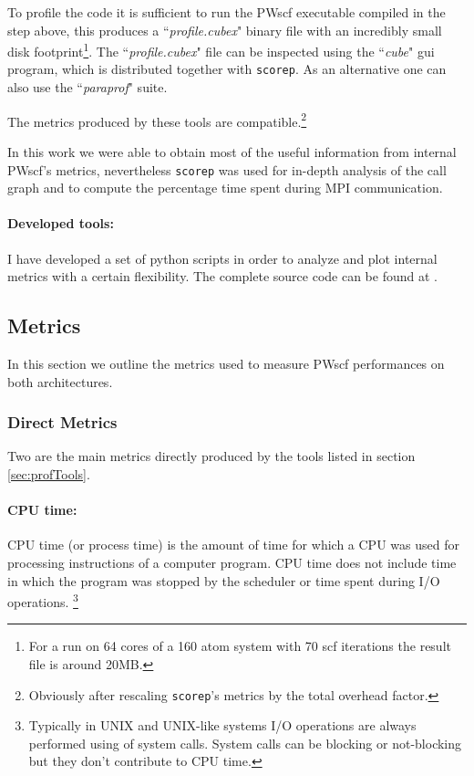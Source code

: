 \documentclass[a4paper,12pt]{article}
\begin{document}
To profile the code it is sufficient to run the PWscf executable compiled in the step above, this produces a ``\textit{profile.cubex}" binary file with an incredibly small disk footprint\footnote{For a run on 64 cores of a 160 atom system with 70 scf iterations the result file is around 20MB.}.
The ``\textit{profile.cubex}" file can be inspected using the ``\textit{cube}" gui program, which is distributed together with \texttt{scorep}. As an alternative one can also use the ``\textit{paraprof}" suite.

The metrics produced by these tools are compatible.\footnote{ Obviously after rescaling \texttt{scorep}'s metrics by the total overhead factor.}

In this work we were able to obtain most of the useful information from internal PWscf's metrics, nevertheless \texttt{scorep} was used for in-depth analysis of the call graph and to compute the percentage time spent during MPI communication.

\paragraph{Developed tools:} I have developed a set of python scripts in order to analyze and plot internal metrics with a certain flexibility. The complete source code can be found at \cite{qetools}.


\subsection{Metrics}\label{sec:Metrics}

In this section we outline the metrics used to measure PWscf performances on both architectures.

\subsubsection{Direct Metrics}\label{sec:DirectMetrics}
Two are the main metrics directly produced by the tools listed in section \ref{sec:profTools}.

\paragraph{CPU time: } CPU time (or process time) is the amount of time for which a CPU was used for processing instructions of a computer program. CPU time does not include time in which the program was stopped by the scheduler or time spent during I/O operations. \footnote{Typically in UNIX and UNIX-like systems I/O operations are always performed using of system calls. System calls can be blocking or not-blocking but they don't contribute to CPU time.}
\end{document}
